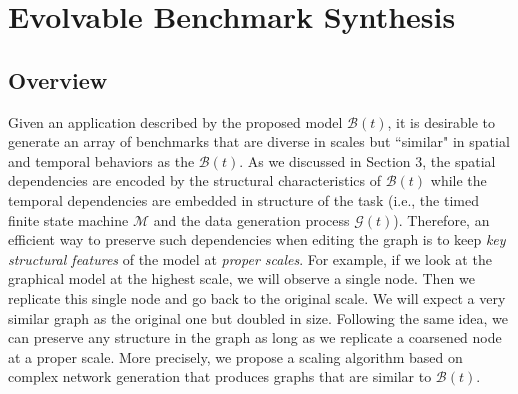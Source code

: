 \section{Evolvable Benchmark Synthesis}
\subsection{Overview}
Given an application described by the proposed model $\mathcal B(t)$, it is desirable to generate an array of benchmarks that are diverse in scales but ``similar" in spatial and temporal behaviors as the $\mathcal B(t)$. As we discussed in Section 3, the spatial dependencies are encoded by the structural characteristics of $\mathcal B(t)$ while the temporal dependencies are embedded in structure of the task (i.e., the timed finite state machine $\mathcal M$ and the data generation process $\mathcal G(t)$).  Therefore, an efficient way to preserve such dependencies when editing the graph is to keep \textit{key structural features} of the model at \textit{proper scales}. For example, if we look at the graphical model at the highest scale, we will observe a single node. Then we replicate this single node and go back to the original scale. We will expect a very similar graph as the original one but doubled in size. Following the same idea, we can preserve any structure in the graph as long as we replicate a coarsened node at a proper scale. More precisely, we propose a scaling algorithm based on complex network generation that produces graphs that are similar to $\mathcal B(t)$. 
